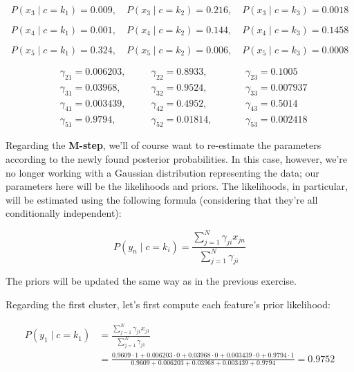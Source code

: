 \documentclass[12pt]{article}
\begin{document}
\begin{enumerate}[leftmargin=\labelsep]
  \begin{equation*}
    P(x_3 \mid c = k_1) = 0.009, \quad P(x_3 \mid c = k_2) = 0.216, \quad P(x_3 \mid c = k_3) = 0.0018
  \end{equation*}

  \begin{equation*}
    P(x_4 \mid c = k_1) = 0.001, \quad P(x_4 \mid c = k_2) = 0.144, \quad P(x_4 \mid c = k_3) = 0.1458
  \end{equation*}

  \begin{equation*}
    P(x_5 \mid c = k_1) = 0.324, \quad P(x_5 \mid c = k_2) = 0.006, \quad P(x_5 \mid c = k_3) = 0.0008
  \end{equation*}

  \begin{equation*}
    \begin{aligned}
       & \gamma_{21} = 0.006203, \quad &  & \gamma_{22} = 0.8933, \quad  &  &  & \gamma_{23} = 0.1005   \\
       & \gamma_{31} = 0.03968, \quad  &  & \gamma_{32} = 0.9524, \quad  &  &  & \gamma_{33} = 0.007937 \\
       & \gamma_{41} = 0.003439, \quad &  & \gamma_{42} = 0.4952, \quad  &  &  & \gamma_{43} = 0.5014   \\
       & \gamma_{51} = 0.9794, \quad   &  & \gamma_{52} = 0.01814, \quad &  &  & \gamma_{53} = 0.002418
    \end{aligned}
  \end{equation*}

  Regarding the \textbf{M-step}, we'll of course want to re-estimate the parameters
  according to the newly found posterior probabilities. In this case, however, we're no
  longer working with a Gaussian distribution representing the data; our parameters here
  will be the likelihoods and priors. The likelihoods, in particular, will be estimated
  using the following formula (considering that they're all conditionally independent):

  \begin{equation*}
    P(y_n \mid c = k_i) = \frac{\sum_{j=1}^N \gamma_{ji} x_{jn}}{\sum_{j=1}^N \gamma_{ji}}
  \end{equation*}

  The priors will be updated the same way as in the previous exercise.

  Regarding the first cluster, let's first compute each feature's prior likelihood:

  \begin{equation*}
    \begin{aligned}
      P(y_1 \mid c = k_1) & = \frac{\sum_{j=1}^N \gamma_{j1} x_{j1}}{\sum_{j=1}^N \gamma_{j1}}                                                                                         \\
                          & = \frac{0.9609 \cdot 1 + 0.006203 \cdot 0 + 0.03968 \cdot 0 + 0.003439 \cdot 0 + 0.9794 \cdot 1}{0.9609 + 0.006203 + 0.03968 + 0.003439 + 0.9794} = 0.9752
    \end{aligned}
  \end{equation*}


\end{enumerate}
\end{document}
